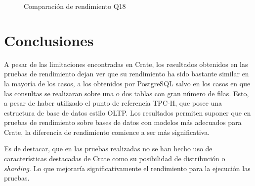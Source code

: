 \documentclass[11pt, twocolumns]{article}
\begin{document}
\begin{multicols}{2}
\begin{figure}[H]
    \caption{Comparación de rendimiento Q18}
	\label{gráfico:gr_resultado_q18}
\end{figure}


\section{Conclusiones}
A pesar de las limitaciones encontradas en Crate, los resultados obtenidos en las pruebas de rendimiento dejan ver que su rendimiento ha sido bastante similar en la mayoría de los casos, a los obtenidos por PostgreSQL salvo en los casos en que las consultas se realizaran sobre una o dos tablas con gran número de filas. Esto, a pesar de haber utilizado el punto de referencia TPC-H, que posee una estructura de base de datos estilo OLTP. Los resultados permiten suponer que en pruebas de rendimiento sobre bases de datos con modelos más adecuados para Crate, la diferencia de rendimiento comience a ser más significativa.
\par
Es de destacar, que en las pruebas realizadas no se han hecho uso de características destacadas de Crate como su posibilidad de distribución o \textit{sharding}. Lo que mejoraría significativamente el rendimiento para la ejecución las pruebas.






\end{multicols}
\end{document}
